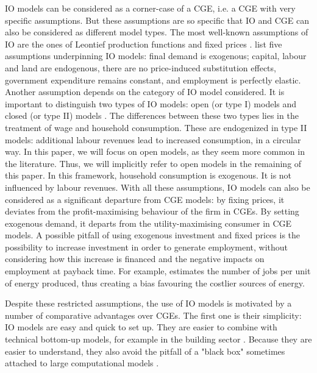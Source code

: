 IO models can be considered as a corner-case of a CGE, i.e. a CGE with very specific assumptions. But these assumptions are so specific that IO and CGE can also be considered as different model types. The most well-known assumptions of IO are the ones of Leontief production functions and fixed prices \citep{Miller2009}. \citet{Dwyer2005} list five assumptions underpinning IO models: final demand is exogenous; capital, labour and land are endogenous, there are no price-induced substitution effects, government expenditure remains constant, and employment is perfectly elastic. 
Another assumption depends on the category of IO model considered. It is important to distinguish two types of IO models: open (or type I) models and closed (or type II) models \citep{Miller2009}. The differences between these two types lies in the treatment of wage and household consumption. These are endogenized in type II models: additional labour revenues lead to increased consumption, in a circular way. In this paper, we will focus on open models, as they seem more common in the literature. Thus, we will implicitly refer to open models in the remaining of this paper. In this framework, household consumption is exogenous. It is not influenced by labour revenues. 
With all these assumptions, IO models can also be considered as a significant departure from CGE models: by fixing prices, it deviates from the profit-maximising behaviour of the firm in CGEs. By setting exogenous demand, it departs from the utility-maximising consumer in CGE models. A possible pitfall of using exogenous investment and fixed prices is the possibility to increase investment in order to generate employment, without considering how this increase is financed and the negative impacts on employment at payback time. For example, \citet{Wei2010} estimates the number of jobs per unit of energy produced, thus creating a bias favouring the costlier sources of energy.

Despite these restricted assumptions, the use of IO models is motivated by a number of comparative advantages over CGEs. The first one is their simplicity: IO models are easy and quick to set up. They are easier to combine with technical bottom-up models, for example in the building sector \citep{Scott2008, Yushchenko2016}. Because they are easier to understand, they also avoid the pitfall of a "black box" sometimes attached to large computational models \citep{Faehn2015}.


